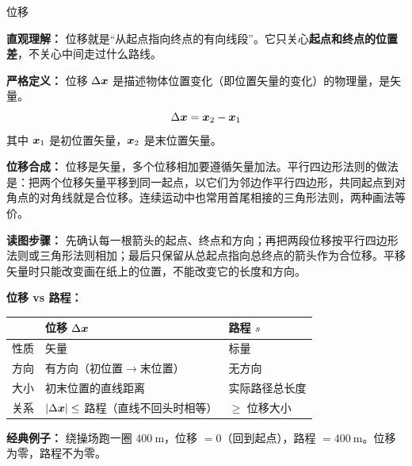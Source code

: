 \begin{conceptbox}{位移}

\textbf{直观理解：} 位移就是“从起点指向终点的有向线段”。它只关心\textbf{起点和终点的位置差}，不关心中间走过什么路线。

\textbf{严格定义：} 位移 $\Delta \boldsymbol{x}$ 是描述物体位置变化（即位置矢量的变化）的物理量，是矢量。
\[
\Delta \boldsymbol{x} = \boldsymbol{x}_2 - \boldsymbol{x}_1
\]
其中 $\boldsymbol{x}_1$ 是初位置矢量，$\boldsymbol{x}_2$ 是末位置矢量。

\textbf{位移合成：} 位移是矢量，多个位移相加要遵循矢量加法。平行四边形法则的做法是：把两个位移矢量平移到同一起点，以它们为邻边作平行四边形，共同起点到对角点的对角线就是合位移。连续运动中也常用首尾相接的三角形法则，两种画法等价。

\begin{center}


\label{fig:displacement-vector-rules}
\end{center}

\textbf{读图步骤：} 先确认每一根箭头的起点、终点和方向；再把两段位移按平行四边形法则或三角形法则相加；最后只保留从总起点指向总终点的箭头作为合位移。平移矢量时只能改变画在纸上的位置，不能改变它的长度和方向。

\textbf{位移 vs 路程：}

\begin{center}
\begin{tabular}{lll}
\toprule
 & 位移 $\Delta\boldsymbol{x}$ & 路程 $s$ \\
\midrule
性质 & 矢量 & 标量 \\
方向 & 有方向（初位置$\to$末位置） & 无方向 \\
大小 & 初末位置的直线距离 & 实际路径总长度 \\
关系 & $|\Delta\boldsymbol{x}| \leq$ 路程（直线不回头时相等） & $\geq$ 位移大小 \\
\bottomrule
\end{tabular}
\end{center}

\textbf{经典例子：} 绕操场跑一圈 $400\ \mathrm{m}$，位移 $= 0$（回到起点），路程 $= 400\ \mathrm{m}$。位移为零，路程不为零。

\end{conceptbox}

